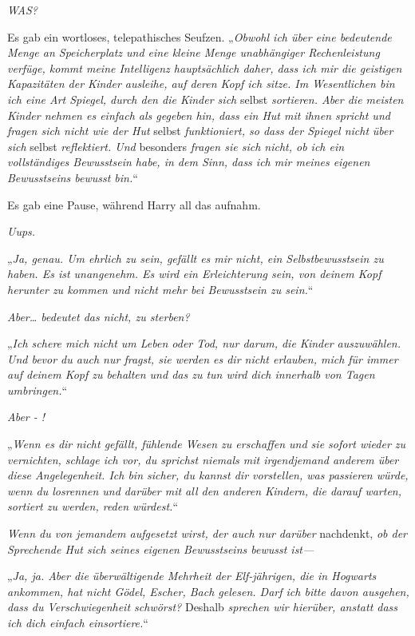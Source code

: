 {\emph{WAS?}

Es gab ein wortloses, telepathisches Seufzen. „\emph{Obwohl ich über eine bedeutende Menge an Speicherplatz und eine kleine Menge unabhängiger Rechenleistung verfüge, kommt meine Intelligenz hauptsächlich daher, dass ich mir die geistigen Kapazitäten der Kinder ausleihe, auf deren Kopf ich sitze. Im Wesentlichen bin ich eine Art Spiegel, durch den die Kinder sich} selbst \emph{sortieren. Aber die meisten Kinder nehmen es einfach als gegeben hin, dass ein Hut mit ihnen spricht und fragen sich nicht wie der Hut} selbst \emph{funktioniert, so dass der Spiegel nicht} \emph{über sich} selbst \emph{reflektiert. Und} besonders \emph{fragen sie sich nicht, ob ich ein vollständiges Bewusstsein habe, in dem Sinn, dass ich mir meines eigenen Bewusstseins bewusst bin.}“

Es gab eine Pause, während Harry all das aufnahm.

\emph{Uups.}

„\emph{Ja, genau. Um ehrlich zu sein, gefällt es mir nicht, ein Selbstbewusstsein zu haben. Es ist unangenehm. Es wird ein Erleichterung sein, von deinem Kopf herunter zu kommen und nicht mehr bei Bewusstsein zu sein.}“

\emph{Aber… bedeutet das nicht, zu sterben?}

„\emph{Ich schere mich nicht um Leben oder Tod, nur darum, die Kinder auszuwählen. Und bevor du auch nur fragst, sie werden es dir nicht erlauben, mich für immer auf deinem Kopf zu behalten und das zu tun wird dich innerhalb von Tagen umbringen.}“

\emph{Aber - !}

„\emph{Wenn es dir nicht gefällt, fühlende Wesen zu erschaffen und sie sofort wieder zu vernichten, schlage ich vor, du sprichst niemals mit irgendjemand anderem über diese Angelegenheit. Ich bin sicher, du kannst dir vorstellen, was passieren würde, wenn du losrennen und darüber mit all den anderen Kindern, die darauf warten, sortiert zu werden, reden würdest.}“

\emph{Wenn du von jemandem aufgesetzt wirst, der auch nur darüber} nachdenkt, \emph{ob der Sprechende Hut sich seines eigenen Bewusstseins bewusst ist—}

„\emph{Ja, ja. Aber die überwältigende Mehrheit der Elf-jährigen, die in Hogwarts ankommen, hat nicht Gödel, Escher, Bach gelesen. Darf ich bitte davon ausgehen, dass du Verschwiegenheit schwörst?} Deshalb \emph{sprechen wir hierüber, anstatt dass ich dich einfach einsortiere.}“

}
